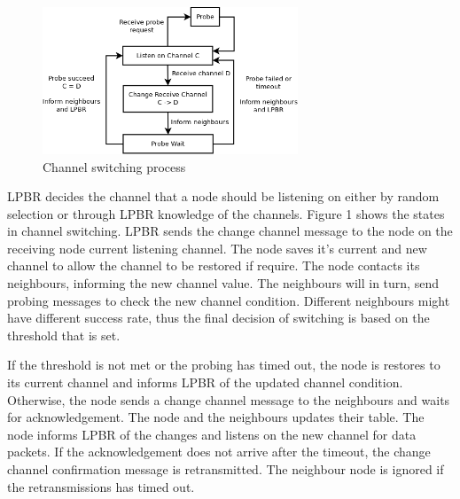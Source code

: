 
\begin{figure}
\centering
\includegraphics[width=3in]{Diagram1}
\caption{Channel switching process}
\label{fig_sim}
\end{figure}

LPBR decides the channel that a node should be listening on either by random selection or through LPBR knowledge of the channels. Figure 1 shows the states in channel switching. LPBR sends the change channel message to the node on the receiving node current listening channel. The node saves it's current and new channel to allow the channel to be restored if require. The node contacts its neighbours, informing the new channel value. The neighbours will in turn, send probing messages to check the new channel condition. Different neighbours might have different success rate, thus the final decision of switching is based on the threshold that is set. 

If the threshold is not met or the probing has timed out, the node is restores to its current channel and informs LPBR of the updated channel condition. Otherwise, the node sends a change channel message to the neighbours and waits for acknowledgement. The node and the neighbours updates their table. The node informs LPBR of the changes and listens on the new channel for data packets. If the acknowledgement does not arrive after the timeout, the change channel confirmation message is retransmitted. The neighbour node is ignored if the retransmissions has timed out. 



